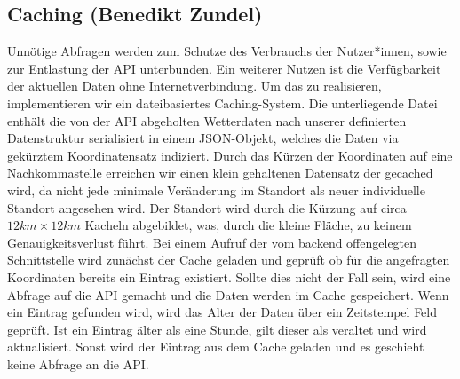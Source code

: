 \documentclass{article}
\begin{document}
\subsection{Caching \small{(Benedikt Zundel)}}
Unnötige Abfragen werden zum Schutze des Verbrauchs der Nutzer*innen, sowie zur Entlastung der API unterbunden. Ein weiterer Nutzen ist die Verfügbarkeit der aktuellen Daten ohne Internetverbindung. Um das zu realisieren, implementieren wir ein dateibasiertes Caching-System. Die unterliegende Datei enthält die von der API abgeholten Wetterdaten nach unserer definierten Datenstruktur serialisiert in einem JSON-Objekt, welches die Daten via gekürztem Koordinatensatz indiziert. Durch das Kürzen der Koordinaten auf eine Nachkommastelle erreichen wir einen klein gehaltenen Datensatz der gecached wird, da nicht jede minimale Veränderung im Standort als neuer individuelle Standort angesehen wird. Der Standort wird durch die Kürzung auf circa $ 12 km \times 12 km $ Kacheln abgebildet, was, durch die kleine Fläche, zu keinem Genauigkeitsverlust führt.
Bei einem Aufruf der vom backend offengelegten Schnittstelle wird zunächst der Cache geladen und geprüft ob für die angefragten Koordinaten bereits ein Eintrag existiert. Sollte dies nicht der Fall sein, wird eine Abfrage auf die API gemacht und die Daten werden im Cache gespeichert. Wenn ein Eintrag gefunden wird, wird das Alter der Daten über ein Zeitstempel Feld geprüft. Ist ein Eintrag älter als eine Stunde, gilt dieser als veraltet und wird aktualisiert. Sonst wird der Eintrag aus dem Cache geladen und es geschieht keine Abfrage an die API.

\newpage



\end{document}
